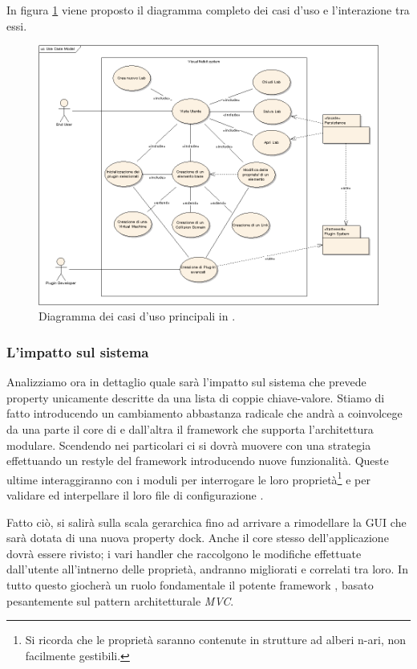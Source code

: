In figura \ref{figura:uc1} viene proposto il diagramma completo dei casi d'uso e l'interazione tra essi.

\begin{figure}[!htb]
	\centering
	\includegraphics[width=12cm]{images/UseCaseModel.png}
	\caption{Diagramma dei casi d'uso principali in \visualnetkit{}.}
	\label{figura:uc1}
\end{figure}

\subsubsection{L'impatto sul sistema}
Analizziamo ora in dettaglio quale sarà l'impatto sul sistema che prevede property unicamente descritte da una lista di coppie chiave-valore. Stiamo di fatto introducendo un cambiamento abbastanza radicale che andrà a coinvolcege da una parte il core di \visualnetkit{} e dall'altra il framework che supporta l'architettura modulare. Scendendo nei particolari ci si dovrà muovere con una strategia \bu{} effettuando un restyle del \plugin{} framework introducendo nuove funzionalità. Queste ultime interaggiranno con i moduli per interrogare le loro proprietà\footnote{Si ricorda che le proprietà saranno contenute in strutture ad alberi n-ari, non facilmente gestibili.} e per validare ed interpellare il loro file di configurazione \xml{}.

Fatto ciò, si salirà sulla scala gerarchica fino ad arrivare a rimodellare la GUI che sarà dotata di una nuova property dock. Anche il core stesso dell'applicazione dovrà essere rivisto; i vari handler che raccolgono le modifiche effettuate dall'utente all'intnerno delle proprietà, andranno migliorati e correlati tra loro. In tutto questo giocherà un ruolo fondamentale il potente framework \qt{}, basato pesantemente sul pattern architetturale \emph{MVC}\cite{QTDOCMVC}.


